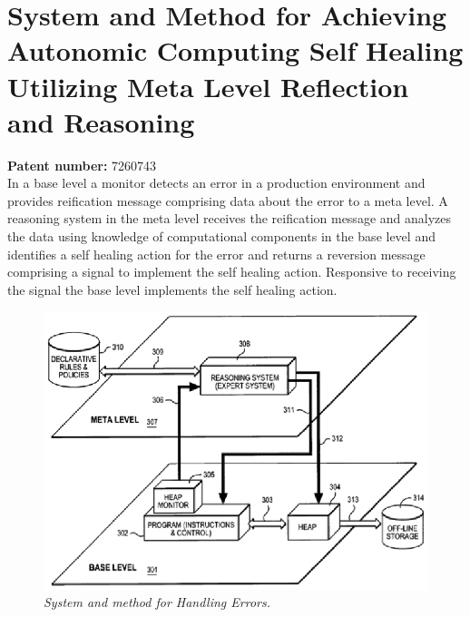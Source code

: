 \section{System and Method for Achieving Autonomic Computing Self Healing Utilizing Meta Level Reflection and Reasoning}
\textbf{Patent number:}  7260743\cite{FELLENSTEIN:2007}\\
In a base level a monitor detects an error in a production environment and provides reification message comprising data about the error to a meta level. A reasoning system in the meta level receives the reification message and analyzes the data using knowledge of computational components in the base level and identifies a self healing action for the error and returns a reversion message comprising a signal to implement the self healing action. Responsive to receiving the signal the base level implements the self healing action.
	\begin{figure}[h]
		\begin{center}
			\includegraphics{figures/patent3.eps} 
			\caption{\small \sl System and method for Handling Errors.\label{fig:Label5}} 
		\end{center} 
	\end{figure}
